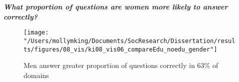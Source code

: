 \documentclass[]{article}
\begin{document}
\vspace{5mm}

\emph{\textbf{What proportion of questions are women more likely to answer correctly?}}
\begin{figure}[ht]
    \begin{center}
      \texttt{[image: "/Users/mollymking/Documents/SocResearch/Dissertation/results/figures/08\_vis/ki08\_vis06\_compareEdu\_noedu\_gender"]}
      \caption{Men answer greater proportion of questions correctly in 63\% of domains}
    \end{center}
\end{figure}
\end{document}
